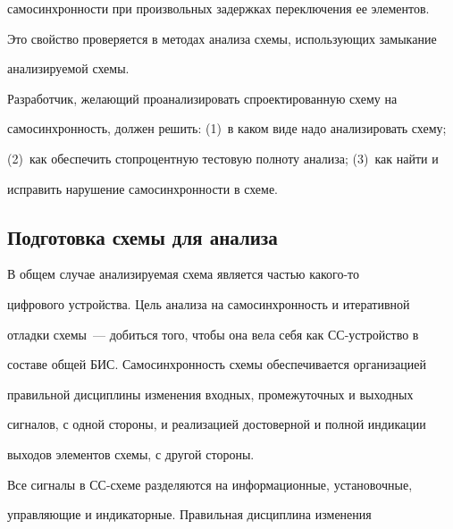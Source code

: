 самосинхронности при произвольных задержках переключения ее элементов. 


Это свойство проверяется в методах анализа схемы, использующих замыкание 


анализируемой схемы.


      


      Разработчик, желающий проанализировать спроектированную схему на 


самосинхронность, должен решить: (1)~в каком виде надо анализировать схему; 


(2)~как обеспечить стопроцентную тестовую полноту анализа; (3)~как найти и 


исправить нарушение самосинхронности в схеме.





\vspace*{-6pt}


      


      \subsection{Подготовка схемы для анализа} %


      


      \vspace*{-1pt}


      


      В общем случае анализируемая схема является частью какого-то 


цифрового устройства. Цель анализа на самосинхронность и итеративной 


отладки схемы~--- добиться того, чтобы она вела себя как СС-устройство в 


составе общей БИС. Самосинхронность схемы обеспечивается организацией 


правильной дисциплины изменения входных, промежуточных и выходных 


сигналов, с одной стороны, и реализацией достоверной и полной индикации 


выходов элементов схемы, с другой стороны.


      


      Все сигналы в СС-схеме разделяются на информационные, установочные, 


управляющие и индикаторные. Правильная дисциплина изменения 


